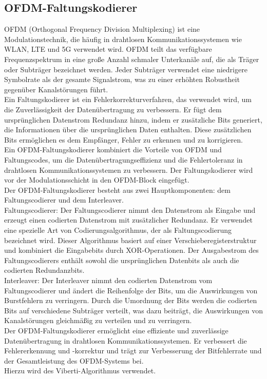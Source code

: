 \documentclass[12pt,a4paper]{article}
\begin{document}
	\subsection{OFDM-Faltungskodierer}
		OFDM (Orthogonal Frequency Division Multiplexing) ist eine Modulationstechnik, die häufig in drahtlosen Kommunikationssystemen wie WLAN, LTE und 5G verwendet wird. OFDM teilt das verfügbare Frequenzspektrum in eine große Anzahl schmaler Unterkanäle auf, die als Träger oder Subträger bezeichnet werden. Jeder Subträger verwendet eine niedrigere Symbolrate als der gesamte Signalstrom, was zu einer erhöhten Robustheit gegenüber Kanalstörungen führt.\\
		Ein Faltungskodierer ist ein Fehlerkorrekturverfahren, das verwendet wird, um die Zuverlässigkeit der Datenübertragung zu verbessern. Er fügt dem ursprünglichen Datenstrom Redundanz hinzu, indem er zusätzliche Bits generiert, die Informationen über die ursprünglichen Daten enthalten. Diese zusätzlichen Bits ermöglichen es dem Empfänger, Fehler zu erkennen und zu korrigieren.\\
		Ein OFDM-Faltungskodierer kombiniert die Vorteile von OFDM und Faltungscodes, um die Datenübertragungseffizienz und die Fehlertoleranz in drahtlosen Kommunikationssystemen zu verbessern. Der Faltungskodierer wird vor der Modulationsschicht in den OFDM-Block eingefügt.\\
		Der OFDM-Faltungskodierer besteht aus zwei Hauptkomponenten: dem Faltungscodierer und dem Interleaver.\\
		Faltungscodierer: Der Faltungscodierer nimmt den Datenstrom als Eingabe und erzeugt einen codierten Datenstrom mit zusätzlicher Redundanz. Er verwendet eine spezielle Art von Codierungsalgorithmus, der als Faltungscodierung bezeichnet wird. Dieser Algorithmus basiert auf einer Verschieberegisterstruktur und kombiniert die Eingabebits durch XOR-Operationen. Der Ausgabestrom des Faltungscodierers enthält sowohl die ursprünglichen Datenbits als auch die codierten Redundanzbits.\\
		Interleaver: Der Interleaver nimmt den codierten Datenstrom vom Faltungscodierer und ändert die Reihenfolge der Bits, um die Auswirkungen von Burstfehlern zu verringern. Durch die Umordnung der Bits werden die codierten Bits auf verschiedene Subträger verteilt, was dazu beiträgt, die Auswirkungen von Kanalstörungen gleichmäßig zu verteilen und zu verringern.\\
		Der OFDM-Faltungskodierer ermöglicht eine effiziente und zuverlässige Datenübertragung in drahtlosen Kommunikationssystemen. Er verbessert die Fehlererkennung und -korrektur und trägt zur Verbesserung der Bitfehlerrate und der Gesamtleistung des OFDM-Systems bei.\\
		Hierzu wird des Viberti-Algorithmus verwendet.
\end{document}
